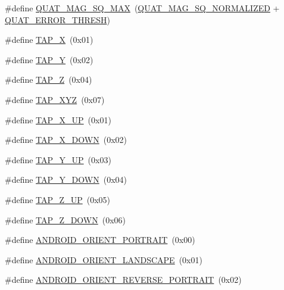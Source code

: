 \begin{DoxyCompactItemize}
\item 
\#define \hyperlink{group___d_r_i_v_e_r_s_ga3036f612f259f4e13c631a31fb0e7176}{Q\+U\+A\+T\+\_\+\+M\+A\+G\+\_\+\+S\+Q\+\_\+\+M\+AX}~(\hyperlink{group___d_r_i_v_e_r_s_ga290880f86641e11d62db9792eab808bd}{Q\+U\+A\+T\+\_\+\+M\+A\+G\+\_\+\+S\+Q\+\_\+\+N\+O\+R\+M\+A\+L\+I\+Z\+ED} + \hyperlink{group___d_r_i_v_e_r_s_ga633dcbd524d41e6f76c0fda39828c8e1}{Q\+U\+A\+T\+\_\+\+E\+R\+R\+O\+R\+\_\+\+T\+H\+R\+E\+SH})
\item 
\#define \hyperlink{group___d_r_i_v_e_r_s_ga22a5ea75ee18a788b441f66fffe83586}{T\+A\+P\+\_\+X}~(0x01)
\item 
\#define \hyperlink{group___d_r_i_v_e_r_s_ga762f9521bf33c9ba7a77595268b108ec}{T\+A\+P\+\_\+Y}~(0x02)
\item 
\#define \hyperlink{group___d_r_i_v_e_r_s_gac2949c36d5f4eeb4769fdcf2d99284fd}{T\+A\+P\+\_\+Z}~(0x04)
\item 
\#define \hyperlink{group___d_r_i_v_e_r_s_gaa2b8e1661eb53aeac3ff4877ff2b79d9}{T\+A\+P\+\_\+\+X\+YZ}~(0x07)
\item 
\#define \hyperlink{group___d_r_i_v_e_r_s_gaa979b4cd872ade6f4904199e83e9f3f4}{T\+A\+P\+\_\+\+X\+\_\+\+UP}~(0x01)
\item 
\#define \hyperlink{group___d_r_i_v_e_r_s_gad3263c4a492cc11a014800d4a6e3311a}{T\+A\+P\+\_\+\+X\+\_\+\+D\+O\+WN}~(0x02)
\item 
\#define \hyperlink{group___d_r_i_v_e_r_s_ga70ea99c21d573b870b91909faf677107}{T\+A\+P\+\_\+\+Y\+\_\+\+UP}~(0x03)
\item 
\#define \hyperlink{group___d_r_i_v_e_r_s_ga3d35b3c219083d14f9fff4a9c65cf783}{T\+A\+P\+\_\+\+Y\+\_\+\+D\+O\+WN}~(0x04)
\item 
\#define \hyperlink{group___d_r_i_v_e_r_s_gab240d8ebc872ea183523f4b3c3f9e346}{T\+A\+P\+\_\+\+Z\+\_\+\+UP}~(0x05)
\item 
\#define \hyperlink{group___d_r_i_v_e_r_s_ga8f0f8c5db2a60932cfde68ca0b9c2032}{T\+A\+P\+\_\+\+Z\+\_\+\+D\+O\+WN}~(0x06)
\item 
\#define \hyperlink{group___d_r_i_v_e_r_s_ga5198482b1487f06b71c9393847ae1897}{A\+N\+D\+R\+O\+I\+D\+\_\+\+O\+R\+I\+E\+N\+T\+\_\+\+P\+O\+R\+T\+R\+A\+IT}~(0x00)
\item 
\#define \hyperlink{group___d_r_i_v_e_r_s_ga388a7f6ac0d53cf96318b0bafa5c1c0a}{A\+N\+D\+R\+O\+I\+D\+\_\+\+O\+R\+I\+E\+N\+T\+\_\+\+L\+A\+N\+D\+S\+C\+A\+PE}~(0x01)
\item 
\#define \hyperlink{group___d_r_i_v_e_r_s_ga63b8f82e9d60a84b6fca8c680d78c866}{A\+N\+D\+R\+O\+I\+D\+\_\+\+O\+R\+I\+E\+N\+T\+\_\+\+R\+E\+V\+E\+R\+S\+E\+\_\+\+P\+O\+R\+T\+R\+A\+IT}~(0x02)

\end{DoxyCompactItemize}

